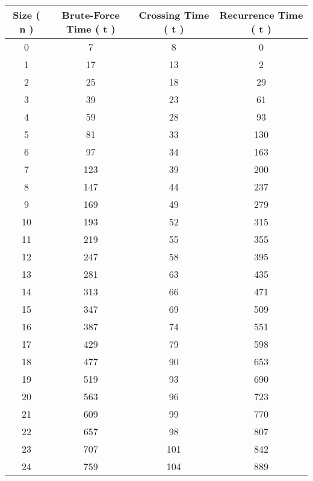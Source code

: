 \begin{center} 
\begin{tabular}[.5cm]{ c c c c } 
\toprule 
\hspace{10pt} Size ( n ) \hspace{10pt} & \hspace{10pt} Brute-Force Time ( t ) \hspace{10pt} & \hspace{10pt} Crossing Time ( t ) \hspace{10pt} & \hspace{10pt} Recurrence Time ( t ) \\ 
\midrule 
0 & 7 & 8 & 0 \\ 
\cmidrule {1-4} 
1 & 17 & 13 & 2 \\ 
\cmidrule {1-4} 
2 & 25 & 18 & 29 \\ 
\cmidrule {1-4} 
3 & 39 & 23 & 61 \\ 
\cmidrule {1-4} 
4 & 59 & 28 & 93 \\ 
\cmidrule {1-4} 
5 & 81 & 33 & 130 \\ 
\cmidrule {1-4} 
6 & 97 & 34 & 163 \\ 
\cmidrule {1-4} 
7 & 123 & 39 & 200 \\ 
\cmidrule {1-4} 
8 & 147 & 44 & 237 \\ 
\cmidrule {1-4} 
9 & 169 & 49 & 279 \\ 
\cmidrule {1-4} 
10 & 193 & 52 & 315 \\ 
\cmidrule {1-4} 
11 & 219 & 55 & 355 \\ 
\cmidrule {1-4} 
12 & 247 & 58 & 395 \\ 
\cmidrule {1-4} 
13 & 281 & 63 & 435 \\ 
\cmidrule {1-4} 
14 & 313 & 66 & 471 \\ 
\cmidrule {1-4} 
15 & 347 & 69 & 509 \\ 
\cmidrule {1-4} 
16 & 387 & 74 & 551 \\ 
\cmidrule {1-4} 
17 & 429 & 79 & 598 \\ 
\cmidrule {1-4} 
18 & 477 & 90 & 653 \\ 
\cmidrule {1-4} 
19 & 519 & 93 & 690 \\ 
\cmidrule {1-4} 
20 & 563 & 96 & 723 \\ 
\cmidrule {1-4} 
21 & 609 & 99 & 770 \\ 
\cmidrule {1-4} 
22 & 657 & 98 & 807 \\ 
\cmidrule {1-4} 
23 & 707 & 101 & 842 \\ 
\cmidrule {1-4} 
24 & 759 & 104 & 889 \\ 

\end{tabular}
\end{center}
